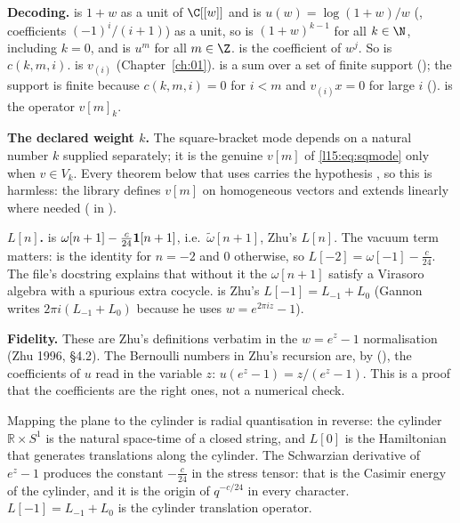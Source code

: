 \begin{dictionary}
\textbf{Decoding.}  is $1+w$ as a unit of $\C[[w]]$ and  is $u(w)=\log(1+w)/w$
(, coefficients $(-1)^i/(i+1)$) as a unit, so  is $(1+w)^{k-1}$
for all $k\in\N$, including $k=0$, and  is $u^m$ for all $m\in\Z$. 
is the coefficient of $w^j$. So  is $c(k,m,i)$.  is $v_{(i)}$
(Chapter~\ref{ch:01}).  is a sum over a set of finite support (); the support is finite because
$c(k,m,i)=0$ for $i<m$ and $v_{(i)}x=0$ for large $i$ ().  is the
operator $v[m]_k$.

\textbf{The declared weight $k$.} The square-bracket mode depends on a natural number $k$ supplied separately; it is the
genuine $v[m]$ of \eqref{l15:eq:sqmode} only when $v\in V_k$. Every theorem below that uses 
carries the hypothesis , so this is harmless: the library defines $v[m]$ on homogeneous
vectors and extends linearly where needed ( in ).

\textbf{$L[n]$.}  is $\omega[n+1]-\frac c{24}\mathbf{1}[n+1]$, i.e.\ $\tilde\omega[n+1]$, Zhu's $L[n]$.
The vacuum term matters:  is the identity for $n=-2$ and $0$ otherwise, so $L[-2]=\omega[-1]-\frac c{24}$.
The file's docstring explains that without it the $\omega[n+1]$ satisfy a Virasoro algebra with a spurious extra
cocycle.  is Zhu's $L[-1]=L_{-1}+L_0$ (Gannon writes $2\pi i(L_{-1}+L_0)$ because he uses
$w=e^{2\pi iz}-1$).

\textbf{Fidelity.} These are Zhu's definitions verbatim in the $w=e^z-1$ normalisation (Zhu 1996, \S4.2). The
Bernoulli numbers in Zhu's recursion are, by  (), the
coefficients of $u$ read in the variable $z$: $u(e^z-1)=z/(e^z-1)$. This is a proof that the coefficients are the right
ones, not a numerical check.
\end{dictionary}

\begin{physics}
Mapping the plane to the cylinder is radial quantisation in reverse: the cylinder $\mathbb{R}\times S^1$ is the natural
space-time of a closed string, and $L[0]$ is the Hamiltonian that generates translations along the cylinder. The
Schwarzian derivative of $e^{z}-1$ produces the constant $-\frac{c}{24}$ in the stress tensor: that is the Casimir energy of
the cylinder, and it is the origin of $q^{-c/24}$ in every character. $L[-1]=L_{-1}+L_0$ is the cylinder translation
operator.
\end{physics}

